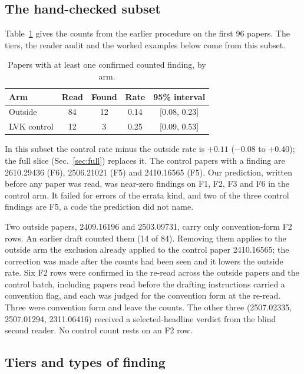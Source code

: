 \documentclass[reprint,amsmath,amssymb,aps,superscriptaddress,nofootinbib]{revtex4-2}
\begin{document}
\subsection{The hand-checked subset}
\label{sec:rates}

Table~\ref{tab:rates} gives the counts from the earlier procedure on the first 96 papers. The tiers, the reader audit and the worked examples below come from this subset.

\begin{table}[t]
\caption{Papers with at least one confirmed counted finding, by arm.}
\label{tab:rates}
\centering\small\setlength{\tabcolsep}{4pt}
\begin{tabular}{lcccc}
\hline\hline
Arm & Read & Found & Rate & 95\% interval \\ \hline
Outside & 84 & 12 & 0.14 & [0.08, 0.23] \\
LVK control & 12 & 3 & 0.25 & [0.09, 0.53] \\
\hline\hline
\end{tabular}
\end{table}

In this subset the control rate minus the outside rate is $+0.11$ ($-0.08$ to $+0.40$); the full slice (Sec.~\ref{sec:full}) replaces it. The control papers with a finding are 2610.29436 (F6), 2506.21021 (F5) and 2410.16565 (F5). Our prediction, written before any paper was read, was near-zero findings on F1, F2, F3 and F6 in the control arm. It failed for errors of the errata kind, and two of the three control findings are F5, a code the prediction did not name.

Two outside papers, 2409.16196 and 2503.09731, carry only convention-form F2 rows. An earlier draft counted them (14 of 84). Removing them applies to the outside arm the exclusion already applied to the control paper 2410.16565; the correction was made after the counts had been seen and it lowers the outside rate. Six F2 rows were confirmed in the re-read across the outside papers and the control batch, including papers read before the drafting instructions carried a convention flag, and each was judged for the convention form at the re-read. Three were convention form and leave the counts. The other three (2507.02335, 2507.01294, 2311.06416) received a selected-headline verdict from the blind second reader. No control count rests on an F2 row.

\subsection{Tiers and types of finding}
\end{document}

